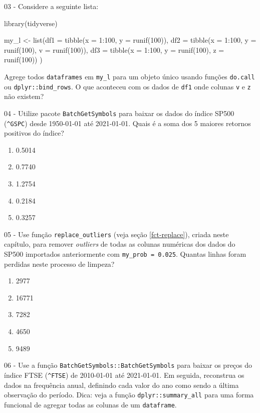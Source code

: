 \documentclass[
  11pt,
]{book}
\newenvironment{Shaded}{\begin{snugshade}}{\end{snugshade}}
\newcommand{\NormalTok}[1]{#1}
\providecommand{\tightlist}{%
  \setlength{\itemsep}{0pt}\setlength{\parskip}{0pt}}
\begin{document}
03 -
Considere a seguinte lista:

\begin{Shaded}
\begin{Highlighting}[]
\NormalTok{library(tidyverse)}

\NormalTok{my\_l \textless{}{-} list(df1 = tibble(x = 1:100, y = runif(100)),}
\NormalTok{             df2 = tibble(x = 1:100, y = runif(100), v = runif(100)),}
\NormalTok{             df3 = tibble(x = 1:100, y = runif(100), z = runif(100)) )}
\end{Highlighting}
\end{Shaded}

Agrege todos \texttt{dataframes} em \texttt{my\_l} para um objeto único usando funções \texttt{do.call} ou \texttt{dplyr::bind\_rows}. O que aconteceu com os dados de \texttt{df1} onde colunas \texttt{v} e \texttt{z} não existem?

04 -
Utilize pacote \texttt{BatchGetSymbols} para baixar os dados do índice SP500 (\texttt{\textquotesingle{}\^{}GSPC\textquotesingle{}}) desde 1950-01-01 até 2021-01-01. Quais é a soma dos 5 maiores retornos positivos do índice?

\begin{enumerate}
\def\labelenumi{\alph{enumi})}
\tightlist
\item
  0.5014
\item
  0.7740
\item
  1.2754
\item
  0.2184
\item
  0.3257
\end{enumerate}

05 -
Use função \texttt{replace\_outliers} (veja seção \ref{fct-replace}), criada neste capítulo, para remover \emph{outliers} de todas as colunas numéricas dos dados do SP500 importados anteriormente com \texttt{my\_prob\ =\ 0.025}. Quantas linhas foram perdidas neste processo de limpeza?

\begin{enumerate}
\def\labelenumi{\alph{enumi})}
\tightlist
\item
  2977
\item
  16771
\item
  7282
\item
  4650
\item
  9489
\end{enumerate}

06 -
Use a função \texttt{BatchGetSymbols::BatchGetSymbols} para baixar os preços do índice FTSE (\texttt{\textquotesingle{}\^{}FTSE\textquotesingle{}}) de 2010-01-01 até 2021-01-01. Em seguida, reconstrua os dados na frequência anual, definindo cada valor do ano como sendo a última observação do período. Dica: veja a função \texttt{dplyr::summary\_all} para uma forma funcional de agregar todas as colunas de um \texttt{dataframe}.
\end{document}
